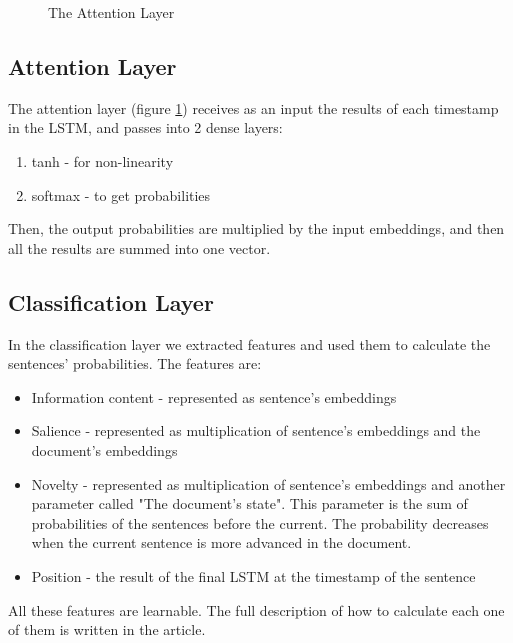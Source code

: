 \documentclass{article}
\begin{document}
\begin{figure}
\begin{minipage}{.5\textwidth}
    \caption{The Attention Layer}
    \label{fig:attention}
\end{minipage}
\end{figure}

\subsection{Attention Layer}
The attention layer (figure \ref{fig:attention})  receives as an input the results of each timestamp in the LSTM, and passes into 2 dense layers:
\begin{enumerate}
    \item tanh - for non-linearity
    \item softmax - to get probabilities
\end{enumerate}

Then, the output probabilities are multiplied by the input embeddings, and then all the results are summed into one vector.

\subsection{Classification Layer}
In the classification layer we extracted features and used them to calculate the sentences' probabilities. The features are:
\begin{itemize}
    \item Information content - represented as sentence's embeddings
    \item Salience - represented as multiplication of sentence's embeddings and the document's embeddings
    \item Novelty - represented as multiplication of sentence's embeddings and another parameter called "The document's state". This parameter is the sum of probabilities of the sentences before the current. The probability decreases when the current sentence is more advanced in the document.
    \item Position - the result of the final LSTM at the timestamp of the sentence
\end{itemize}
All these features are learnable. The full description of how to calculate each one of them is written in the article.
\end{document}
